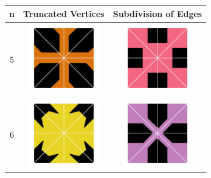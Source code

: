 \documentclass{beamer}
\begin{document}
\begin{frame}
\begin{table}
\centering
\begin{tabular}{c|c|c}
n & Truncated Vertices & Subdivision of Edges \\\hline
5 & \includegraphics[width=3cm]{img/claire/20tv} &\includegraphics[width=3cm]{img/claire/20se} \\\hline
6 &\includegraphics[width=3cm]{img/claire/24_tv} &\includegraphics[width=3cm]{img/claire/24se}\\\hline
\end{tabular}
\end{table}
\end{frame}
\end{document}
